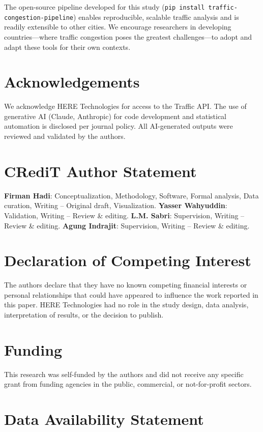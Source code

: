 \documentclass[review,authoryear]{elsarticle}
\begin{document}
The open-source pipeline developed for this study (\texttt{pip install traffic-congestion-pipeline}) enables reproducible, scalable traffic analysis and is readily extensible to other cities. We encourage researchers in developing countries---where traffic congestion poses the greatest challenges---to adopt and adapt these tools for their own contexts.

\section{Acknowledgements}

We acknowledge HERE Technologies for access to the Traffic API. The use of generative AI (Claude, Anthropic) for code development and statistical automation is disclosed per journal policy. All AI-generated outputs were reviewed and validated by the authors.

\section{CRediT Author Statement}

\textbf{Firman Hadi}: Conceptualization, Methodology, Software, Formal analysis, Data curation, Writing -- Original draft, Visualization.
\textbf{Yasser Wahyuddin}: Validation, Writing -- Review \& editing.
\textbf{L.M. Sabri}: Supervision, Writing -- Review \& editing.
\textbf{Agung Indrajit}: Supervision, Writing -- Review \& editing.

\section{Declaration of Competing Interest}

The authors declare that they have no known competing financial interests or personal relationships that could have appeared to influence the work reported in this paper. HERE Technologies had no role in the study design, data analysis, interpretation of results, or the decision to publish.

\section{Funding}

This research was self-funded by the authors and did not receive any specific grant from funding agencies in the public, commercial, or not-for-profit sectors.

\section{Data Availability Statement}
\end{document}
